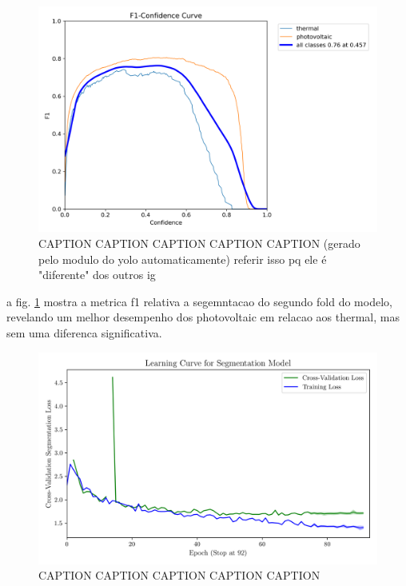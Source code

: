 \documentclass[conference]{IEEEtran}
\begin{document}
\begin{figure}[H]
    \centering
    \includegraphics[width=1\linewidth]{assets/model02_yolof1.png}
    \caption{CAPTION CAPTION CAPTION CAPTION CAPTION (gerado pelo modulo do yolo automaticamente) referir isso pq ele é "diferente" dos outros ig}
    \label{fig:model02_yolof1}
\end{figure}

a fig. \ref{fig:model02_yolof1} mostra a metrica f1 relativa a segemntacao do segundo fold do modelo, revelando um melhor desempenho dos photovoltaic em relacao aos thermal, mas sem uma diferenca significativa.

\begin{figure}[H]
    \centering
    \includegraphics[width=1\linewidth]{assets/model02_lc.png}
    \caption{CAPTION CAPTION CAPTION CAPTION CAPTION}
    \label{fig:model02_lc}
\end{figure}
\end{document}
